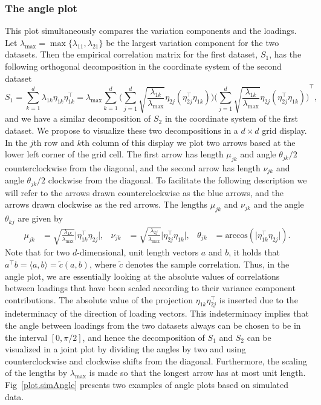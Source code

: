 \documentclass[a4paper,14pt]{article}
\newcommand{\acos}{\text{arccos}}
\begin{document}
\subsubsection*{The angle plot}
This plot simultaneously compares the variation components and the loadings. Let $\lambda_{\max} = \max\{ \lambda_{11}, \lambda_{21} \}$ be the largest variation component for the two datasets. Then the empirical correlation matrix for the first dataset, $S_1$, has the following orthogonal decomposition in the coordinate system of the second dataset
\begin{equation*}
S_1 = \sum_{k=1}^d \lambda_{1k} \eta_{1k} \eta_{1k}^\top
= \lambda_{\max} \sum_{k=1}^d
\Bigg( \sum_{j=1}^d \sqrt{\frac{\lambda_{1k}}{\lambda_{\max}}} \eta_{2j} (\eta_{2j}^\top \eta_{1k}) \Bigg)
{\Bigg( \sum_{j=1}^d \sqrt{\frac{\lambda_{1k}}{\lambda_{\max}}} \eta_{2j} (\eta_{2j}^\top \eta_{1k}) \Bigg)}^\top,
\end{equation*}
and we have a similar decomposition of $S_2$ in the coordinate system of the first dataset. We propose to visualize these two decompositions in a $d \times d$ grid display. In the $j$th row and $k$th column of this display we plot two arrows based at the lower left corner of the grid cell. The first arrow has length $\mu_{jk}$ and angle $\theta_{jk}/2$ counterclockwise from the diagonal, and the second arrow has length $\nu_{jk}$ and angle $\theta_{jk}/2$ clockwise from the diagonal. To facilitate the following description we will refer to the arrows drawn counterclockwise as the blue arrows, and the arrows drawn clockwise as the red arrows. The lengths $\mu_{jk}$ and $\nu_{jk}$ and the angle $\theta_{kj}$ are given by
\begin{align*}
\mu_{jk} &= \sqrt{\frac{\lambda_{1k}}{\lambda_{\max}}} \lvert \eta_{1k}^\top \eta_{2j} \rvert, &
\nu_{jk} &= \sqrt{\frac{\lambda_{2j}}{\lambda_{\max}}} \lvert \eta_{2j}^\top \eta_{1k} \rvert, &
\theta_{jk} &= \acos(\lvert \eta_{1k}^\top \eta_{2j} \rvert).
\end{align*}
Note that for two $d$-dimensional, unit length vectors $a$ and $b$, it holds that $ a^\top b = \langle a, b \rangle = \tilde{c}(a,b)$, where $\tilde{c}$ denotes the sample correlation. Thus, in the angle plot, we are essentially looking at the absolute values of correlations between loadings that have been scaled according to their variance component contributions. The absolute value of the projection $\eta_{1k} \eta_{2j}^\top$ is inserted due to the indeterminacy of the direction of loading vectors. This indeterminacy implies that the angle between loadings from the two datasets always can be chosen to be in the interval $[0,\pi/2]$, and hence the decomposition of $S_1$ and $S_2$ can be visualized in a joint plot by dividing the angles by two and using counterclockwise and clockwise shifts from the diagonal. Furthermore, the scaling of the lengths by $\lambda_{\max}$ is made so that the longest arrow has at most unit length. Fig~\ref{plot.simAngle} presents two examples of angle plots based on simulated data.
\end{document}

